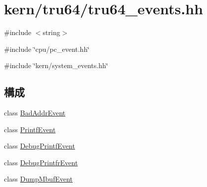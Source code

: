 \hypertarget{tru64__events_8hh}{
\section{kern/tru64/tru64\_\-events.hh}
\label{tru64__events_8hh}
}
{\ttfamily \#include $<$string$>$}\par
{\ttfamily \#include \char`\"{}cpu/pc\_\-event.hh\char`\"{}}\par
{\ttfamily \#include \char`\"{}kern/system\_\-events.hh\char`\"{}}\par
\subsection*{構成}
\begin{DoxyCompactItemize}
\item 
class \hyperlink{classBadAddrEvent}{BadAddrEvent}
\item 
class \hyperlink{classPrintfEvent}{PrintfEvent}
\item 
class \hyperlink{classDebugPrintfEvent}{DebugPrintfEvent}
\item 
class \hyperlink{classDebugPrintfrEvent}{DebugPrintfrEvent}
\item 
class \hyperlink{classDumpMbufEvent}{DumpMbufEvent}
\end{DoxyCompactItemize}
